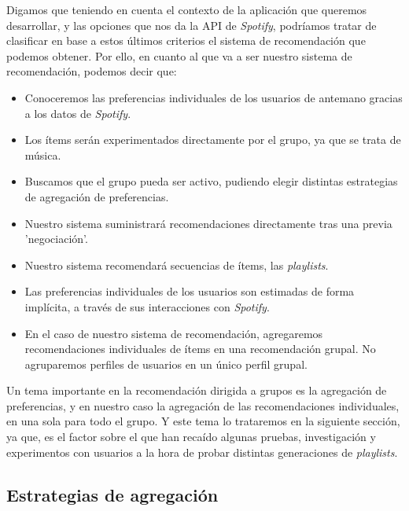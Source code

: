 Digamos que teniendo en cuenta el contexto de la aplicación que queremos desarrollar, y las opciones que nos da la API de \textit{Spotify}, podríamos tratar 
de clasificar en base a estos últimos criterios el sistema de recomendación que podemos obtener. Por ello, en cuanto al que va a ser nuestro sistema de recomendación, 
podemos decir que:
\begin{itemize}
    \item Conoceremos las preferencias individuales de los usuarios de antemano gracias a los datos de \textit{Spotify}.
    \item Los ítems serán experimentados directamente por el grupo, ya que se trata de música.
    \item Buscamos que el grupo pueda ser activo, pudiendo elegir distintas estrategias de agregación de preferencias.
    \item Nuestro sistema suministrará recomendaciones directamente tras una previa 'negociación'.
    \item Nuestro sistema recomendará secuencias de ítems, las \textit{playlists}.
    \item Las preferencias individuales de los usuarios son estimadas de forma implícita, a través de sus interacciones con \textit{Spotify}.
    \item En el caso de nuestro sistema de recomendación, agregaremos recomendaciones individuales de ítems en una recomendación grupal. No agruparemos
    perfiles de usuarios en un único perfil grupal.
\end{itemize}

Un tema importante en la recomendación dirigida a grupos es la agregación de preferencias, y en nuestro caso la agregación de las recomendaciones 
individuales, en una sola para todo el grupo. Y este tema lo trataremos en la siguiente sección, ya que, es el factor sobre el que han recaído 
algunas pruebas, investigación y experimentos con usuarios a la hora de probar distintas generaciones de \textit{playlists}.

\subsection{Estrategias de agregación\label{SEC:AGREGACION}}

